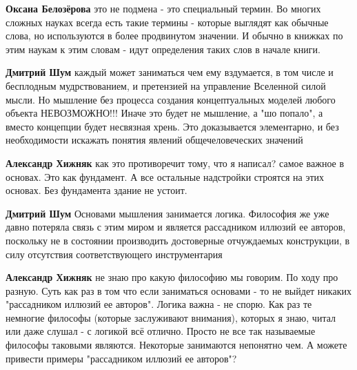 \begin{itemize}
\begin{itemize}
\textbf{Оксана Белозёрова} это не подмена - это специальный термин. Во многих
сложных науках всегда есть такие термины - которые выглядят как обычные слова,
но используются в более продвинутом значении. И обычно в книжках по этим наукам
к этим словам - идут определения таких слов в начале книги.

 
\textbf{Дмитрий Шум} каждый может заниматься чем ему вздумается, в том числе и
бесплодным мудрствованием, и претензией на управление Вселенной силой мысли. Но
мышление без процесса создания концептуальных моделей любого объекта
НЕВОЗМОЖНО!!! Иначе это будет не мышление, а "шо попало", а вместо концепции
будет несвязная хрень. Это доказывается элементарно, и без необходимости
искажать понятия явлений общечеловеческих значений

 
\textbf{Александр Хижняк} как это противоречит тому, что я написал? самое
важное в основах. Это как фундамент. А все остальные надстройки строятся на
этих основах. Без фундамента здание не устоит.

 
\textbf{Дмитрий Шум} Основами мышления занимается логика. Философия же уже
давно потеряла связь с этим миром и является рассадником иллюзий ее авторов,
поскольку не в состоянии производить достоверные отчуждаемых конструкции, в
силу отсутствия соответствующего инструментария

 
\textbf{Александр Хижняк} не знаю про какую философию мы говорим. По ходу про
разную. Суть как раз в том что если заниматься основами - то не выйдет никаких
"рассадником иллюзий ее авторов". Логика важна - не спорю. Как раз те немногие
философы (которые заслуживают внимания), которых я знаю, читал или даже слушал
- с логикой всё отлично. Просто не все так называемые философы таковыми
являются. Некоторые занимаются непонятно чем. А можете привести примеры
"рассадником иллюзий ее авторов"?


\end{itemize}
\end{itemize}
